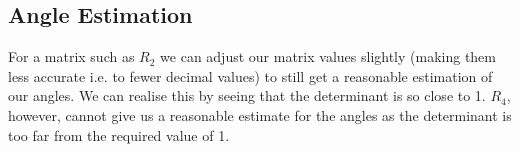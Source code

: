 	\subsection{Angle Estimation}
	For a matrix such as $R_{2}$ we can adjust our matrix values slightly (making them less accurate i.e. to fewer decimal values) to still get a reasonable estimation of our angles. We can realise this by seeing that the determinant is so close to 1.
	$R_{4}$, however, cannot give us a reasonable estimate for the angles as the determinant is too far from the required value of 1.
